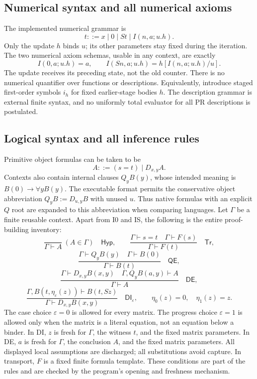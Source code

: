 \documentclass[11pt,letterpaper]{article}
\theoremstyle{definition}\newtheorem{definition}[theorem]{Definition}
\theoremstyle{remark}\newtheorem{remark}[theorem]{Remark}
\begin{document}
\subsection{Numerical syntax and all numerical axioms}

The implemented numerical grammar is
\[
 t::=x\mid0\mid St\mid I(n,a;u.h).
\]
Only the update $h$ binds $u$; its other parameters stay fixed during
the iteration. The two numerical axiom schemas, usable in any context,
are exactly
\[
 I(0,a;u.h)=a,\qquad
 I(Sn,a;u.h)=h[I(n,a;u.h)/u].
 \tag{I0, IS}
\]
The update receives its preceding state, not the old counter.
There is no numerical quantifier over functions or descriptions.
Equivalently, introduce staged first-order symbols $i_h$ for fixed
earlier-stage bodies $h$. The description grammar is external finite
syntax, and no uniformly total evaluator for all PR descriptions is
postulated.

\subsection{Logical syntax and all inference rules}

Primitive object formulas can be taken to be
\[
 A::=(s=t)\mid D_{x,y}A.
\]
Contexts also contain internal clauses $Q_yB(y)$, whose intended
meaning is $B(0)\to\forall yB(y)$. The executable format permits the
conservative object abbreviation
$Q_yB:=D_{u,y}B$ with unused $u$. Thus native formulas with an explicit
$Q$ root are expanded to this abbreviation when comparing languages.
Let $\Gamma$ be a finite reusable context. Apart from I0 and IS, the
following is the entire proof-building inventory:
\[
 \frac{}{\Gamma\vdash A}\ (A\in\Gamma)\quad\mathsf{Hyp},
 \qquad
 \frac{\Gamma\vdash s=t\quad\Gamma\vdash F(s)}
      {\Gamma\vdash F(t)}\quad\mathsf{Tr},
\]
\[
 \frac{\Gamma\vdash Q_yB(y)\quad\Gamma\vdash B(0)}
      {\Gamma\vdash B(t)}\quad\mathsf{QE},
\]
\[
 \frac{\Gamma\vdash D_{x,y}B(x,y)\quad
       \Gamma,Q_yB(a,y)\vdash A}
      {\Gamma\vdash A}\quad\mathsf{DE},
\]
\[
 \frac{\Gamma,B(t,\eta_\varepsilon(z))\vdash B(t,Sz)}
      {\Gamma\vdash D_{x,y}B(x,y)}\quad\mathsf{DI}_\varepsilon,
 \qquad \eta_0(z)=0,\quad\eta_1(z)=z.
 \tag{Choice DI}
\]
The case choice $\varepsilon=0$ is allowed for every matrix. The
progress choice $\varepsilon=1$ is allowed only when the matrix is
a literal equation, not an equation below a binder. In DI, $z$ is
fresh for $\Gamma$, the witness $t$, and the fixed matrix parameters.
In DE, $a$ is fresh for $\Gamma$, the conclusion $A$, and the fixed
matrix parameters. All displayed local assumptions are discharged;
all substitutions avoid capture. In transport, $F$ is a fixed finite
formula template. These conditions are part of the rules and are
checked by the program's opening and freshness mechanism.
\end{document}
